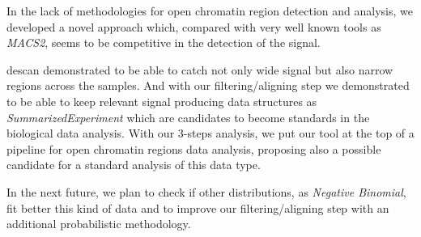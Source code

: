 In the lack of methodologies for open chromatin region detection and analysis, we developed a novel approach which, compared with very well known tools as \textit{MACS2}, seems to be competitive in the detection of the signal.

\gls{descan} demonstrated to be able to catch not only wide signal but also narrow regions across the samples. 
And with our filtering/aligning step we demonstrated to be able to keep relevant signal producing data structures as \textit{SummarizedExperiment} which are candidates to become standards in the biological data analysis.
With our 3-steps analysis, we put our tool at the top of a pipeline for open chromatin regions data analysis, proposing also a possible candidate for a standard analysis of this data type.

In the next future, we plan to check if other distributions, as \textit{Negative Binomial}, fit better this kind of data and to improve our filtering/aligning step with an additional probabilistic methodology.

